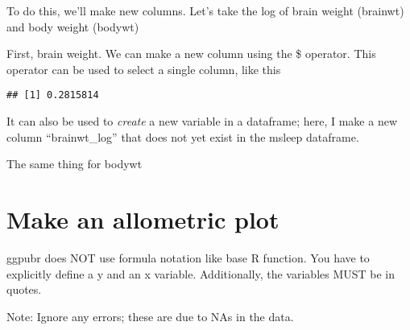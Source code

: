 \documentclass[
]{book}
\newenvironment{Shaded}{\begin{snugshade}}{\end{snugshade}}
\newcommand{\AttributeTok}[1]{\textcolor[rgb]{0.77,0.63,0.00}{#1}}
\newcommand{\FunctionTok}[1]{\textcolor[rgb]{0.00,0.00,0.00}{#1}}
\newcommand{\NormalTok}[1]{#1}
\newcommand{\OtherTok}[1]{\textcolor[rgb]{0.56,0.35,0.01}{#1}}
\newcommand{\SpecialCharTok}[1]{\textcolor[rgb]{0.00,0.00,0.00}{#1}}
\begin{document}
To do this, we'll make new columns. Let's take the log of brain weight (brainwt) and body weight (bodywt)

First, brain weight. We can make a new column using the \$ operator. This operator can be used to select a single column, like this

\begin{Shaded}
\end{Shaded}

\begin{verbatim}
## [1] 0.2815814
\end{verbatim}

It can also be used to \emph{create} a new variable in a dataframe; here, I make a new column ``brainwt\_log'' that does not yet exist in the msleep dataframe.

\begin{Shaded}
\end{Shaded}

The same thing for bodywt

\begin{Shaded}
\end{Shaded}

\hypertarget{make-an-allometric-plot}{%
\section{Make an allometric plot}\label{make-an-allometric-plot}}

ggpubr does NOT use formula notation like base R function. You have to explicitly define a y and an x variable. Additionally, the variables MUST be in quotes.

Note: Ignore any errors; these are due to NAs in the data.
\end{document}
